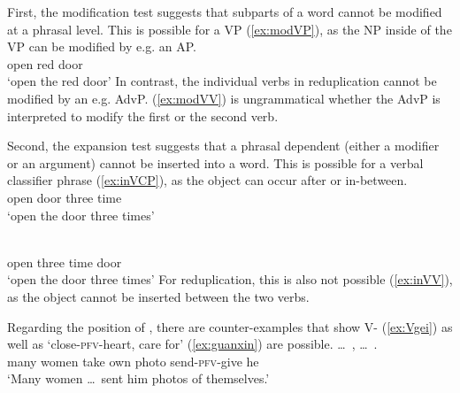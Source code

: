 \documentclass[fleqn,twoside]{article}
\begin{document}
\begin{enumerate}
First, the modification test suggests that subparts of a word cannot be modified at a phrasal level.
This is possible for a VP (\ref{ex:modVP}), as the NP inside of the VP can be modified by e.g. an AP.
\ea\label{ex:modVP} %
\gll {}  \\
open  red door\\
\glt `open the red door'
\z
In contrast, the individual verbs in reduplication cannot be modified by an e.g. AdvP.
(\ref{ex:modVV}) is ungrammatical whether the AdvP is interpreted to modify the first or the second verb.
\z


Second, the expansion test suggests that a phrasal dependent (either a modifier or an argument) cannot be inserted into a word.
This is possible for a verbal classifier phrase (\ref{ex:inVCP}), as the object can occur after or in-between.
\ea\label{ex:inVCP}%
\ea \gll {}   \\
open door three time\\
\glt `open the door three times'

\ex  \gll {}    \\
open three time door\\
\glt `open the door three times'
\z\z
For reduplication, this is also not possible (\ref{ex:inVV}), as the object cannot be inserted between the two verbs.
\ea\label{ex:inVV}

\z\z

Regarding the position of , there are counter-examples that show V- (\ref{ex:Vgei}) as well as  `close-\textsc{pfv}-heart, care for' (\ref{ex:guanxin}) are possible.
\ea\label{ex:Vgei}%
\gll \ldots\,  ,    \ldots\,  .\\
{} many women take own photo {} send-\textsc{pfv}-give he\\
\glt `Many women \ldots\, sent him photos of themselves.'
\z


\end{enumerate}
\end{document}
